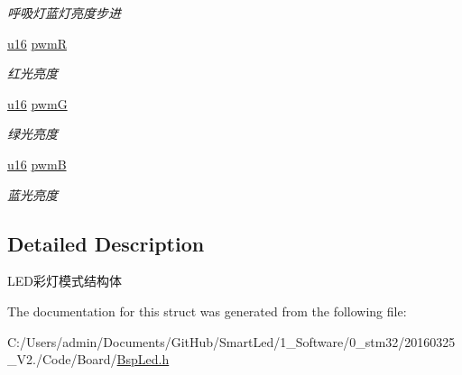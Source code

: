 \begin{DoxyCompactItemize}
\begin{DoxyCompactList}\small\item\em 呼吸灯蓝灯亮度步进 \end{DoxyCompactList}\item 
\hypertarget{struct_s_t_r___color_a165615babb79a43c9253b3a51471cb6d}{\hyperlink{group___b_s_p_ga9e6c91d77e24643b888dbd1a1a590054}{u16} \hyperlink{struct_s_t_r___color_a165615babb79a43c9253b3a51471cb6d}{pwm\-R}}\label{struct_s_t_r___color_a165615babb79a43c9253b3a51471cb6d}

\begin{DoxyCompactList}\small\item\em 红光亮度 \end{DoxyCompactList}\item 
\hypertarget{struct_s_t_r___color_a19030f7f975c816b6a80316b50867c1a}{\hyperlink{group___b_s_p_ga9e6c91d77e24643b888dbd1a1a590054}{u16} \hyperlink{struct_s_t_r___color_a19030f7f975c816b6a80316b50867c1a}{pwm\-G}}\label{struct_s_t_r___color_a19030f7f975c816b6a80316b50867c1a}

\begin{DoxyCompactList}\small\item\em 绿光亮度 \end{DoxyCompactList}\item 
\hypertarget{struct_s_t_r___color_a63032bb8a69caa94ea190ea2c2f17545}{\hyperlink{group___b_s_p_ga9e6c91d77e24643b888dbd1a1a590054}{u16} \hyperlink{struct_s_t_r___color_a63032bb8a69caa94ea190ea2c2f17545}{pwm\-B}}\label{struct_s_t_r___color_a63032bb8a69caa94ea190ea2c2f17545}

\begin{DoxyCompactList}\small\item\em 蓝光亮度 \end{DoxyCompactList}\end{DoxyCompactItemize}


\subsection{\-Detailed \-Description}
\-L\-E\-D彩灯模式结构体 

\-The documentation for this struct was generated from the following file\-:\begin{DoxyCompactItemize}
\item 
\-C\-:/\-Users/admin/\-Documents/\-Git\-Hub/\-Smart\-Led/1\-\_\-\-Software/0\-\_\-stm32/20160325\-\_\-\-V2./\-Code/\-Board/\hyperlink{_bsp_led_8h}{\-Bsp\-Led.\-h}\end{DoxyCompactItemize}
